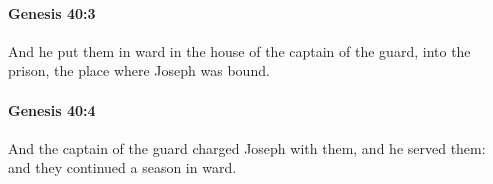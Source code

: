 		\paragraph{Genesis 40:3} %
			\label{GENESIS-40-3}

			And he put them in ward in the house of the captain of the guard, into the prison, the place where Joseph was bound.


		\paragraph{Genesis 40:4} %
			\label{GENESIS-40-4}

			And the captain of the guard charged Joseph with them, and he served them: and they continued a season in ward.


